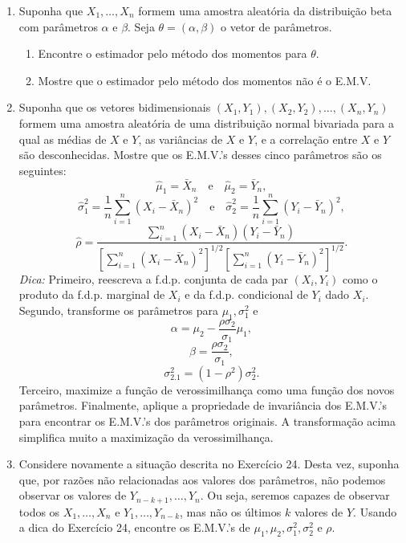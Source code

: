 \begin{enumerate}
    \item Suponha que $X_1, \dots, X_n$ formem uma amostra aleatória da distribuição beta com parâmetros $\alpha$ e $\beta$. Seja $\theta=(\alpha, \beta)$ o vetor de parâmetros.
    \begin{enumerate}
        \item Encontre o estimador pelo método dos momentos para $\theta$.
        \item Mostre que o estimador pelo método dos momentos não é o E.M.V.
    \end{enumerate}
    
    \item Suponha que os vetores bidimensionais $(X_1, Y_1), (X_2, Y_2), \dots, (X_n, Y_n)$ formem uma amostra aleatória de uma distribuição normal bivariada para a qual as médias de $X$ e $Y$, as variâncias de $X$ e $Y$, e a correlação entre $X$ e $Y$ são desconhecidas. Mostre que os E.M.V.'s desses cinco parâmetros são os seguintes:
    $$ \hat{\mu}_1 = \bar{X}_n \quad \text{e} \quad \hat{\mu}_2 = \bar{Y}_n, $$
    $$ \hat{\sigma}_1^2 = \frac{1}{n}\sum_{i=1}^{n}(X_i - \bar{X}_n)^2 \quad \text{e} \quad \hat{\sigma}_2^2 = \frac{1}{n}\sum_{i=1}^{n}(Y_i - \bar{Y}_n)^2, $$
    $$ \hat{\rho} = \frac{\sum_{i=1}^{n}(X_i - \bar{X}_n)(Y_i - \bar{Y}_n)}{\left[\sum_{i=1}^{n}(X_i - \bar{X}_n)^2\right]^{1/2}\left[\sum_{i=1}^{n}(Y_i - \bar{Y}_n)^2\right]^{1/2}}. $$
    \textit{Dica:} Primeiro, reescreva a f.d.p. conjunta de cada par $(X_i, Y_i)$ como o produto da f.d.p. marginal de $X_i$ e da f.d.p. condicional de $Y_i$ dado $X_i$. Segundo, transforme os parâmetros para $\mu_1, \sigma_1^2$ e
    $$ \alpha = \mu_2 - \frac{\rho\sigma_2}{\sigma_1}\mu_1, $$
    $$ \beta = \frac{\rho\sigma_2}{\sigma_1}, $$
    $$ \sigma_{2.1}^2 = (1-\rho^2)\sigma_2^2. $$
    Terceiro, maximize a função de verossimilhança como uma função dos novos parâmetros. Finalmente, aplique a propriedade de invariância dos E.M.V.'s para encontrar os E.M.V.'s dos parâmetros originais. A transformação acima simplifica muito a maximização da verossimilhança.
    
    \item Considere novamente a situação descrita no Exercício 24. Desta vez, suponha que, por razões não relacionadas aos valores dos parâmetros, não podemos observar os valores de $Y_{n-k+1}, \dots, Y_n$. Ou seja, seremos capazes de observar todos os $X_1, \dots, X_n$ e $Y_1, \dots, Y_{n-k}$, mas não os últimos $k$ valores de $Y$. Usando a dica do Exercício 24, encontre os E.M.V.'s de $\mu_1, \mu_2, \sigma_1^2, \sigma_2^2$ e $\rho$.
\end{enumerate}